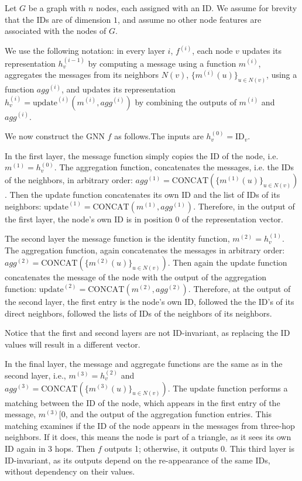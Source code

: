 Let $G$ be a graph with $n$ nodes, each assigned with an ID. We assume for brevity that the IDs are of dimension $1$, and assume no other node features are associated with the nodes of $G$. 

We use the following notation: in every layer $i$, $f^{(i)}$, each node $v$ updates its representation $h_v^{(i-1)}$ by computing a message using a function $m^{(i)}$, aggregates the messages from its neighbors $N(v)$, $\{m^{(i)}(u)\}_{u \in N(v)}$, using a function $agg^{(i)}$, and updates its representation $h_v^{(i)} = \text{update}^{(i)}(m^{(i)}, agg^{(i)})$ by combining the outputs of $m^{(i)}$ and $agg^{(i)}$.

We now construct the GNN $f$ as follows.The inputs are $h_v^{(0)} = \text{ID}_v$.

In the first layer, the message function simply copies the ID of the node, i.e. $m^{(1)} = h_v^{(0)}$. The aggregation function, concatenates the messages, i.e. the IDs of the neighbors, in arbitrary order: $agg^{(1)} = \text{CONCAT}(\{m^{(1)}(u)\}_{u \in N(v)})$. Then the update function concatenates its own ID and the list of IDs of its neighbors: $\text{update}^{(1)} = \text{CONCAT}(m^{(1)}, agg^{(1)})$. Therefore, in the output of the first layer, the node's own ID is in position $0$ of the representation vector.

The second layer the message function is the identity function, $m^{(2)} = h_v^{(1)}$.
 The aggregation function, again concatenates the messages in arbitrary order: $agg^{(2)} = \text{CONCAT}(\{m^{(2)}(u)\}_{u \in N(v)})$. 
Then again the update function concatenates the message of the node with the output of the aggregation function: $\text{update}^{(2)} = \text{CONCAT}(m^{(2)}, agg^{(2)})$.
Therefore, at the output of the second layer, the first entry is the node's own ID, followed the the ID's of its direct neighbors, followed the lists of IDs of the neighbors of its neighbors. 

Notice that the first and second layers are not ID-invariant, as replacing the ID values will result in a different vector.

In the final layer, the message and aggregate functions are the same as in the second layer, i.e., $m^{(3)} =h_v^{(2)}$ and $agg^{(3)} = \text{CONCAT}(\{m^{(3)}(u)\}_{u \in N(v)})$.
The update function performs a matching between the ID of the node, which appears in the first entry of the message, $m^{(3)}[0$,
and the output of the aggregation function entries. This matching examines if the ID of the node appears in the messages from three-hop neighbors. If it does, this means the node is part of a triangle, as it sees its own ID again in 3 hops. Then $f$  outputs 1; otherwise, it outputs 0. This third layer is ID-invariant, as its outputs depend on the re-appearance of the same IDs, without dependency on their values. 



